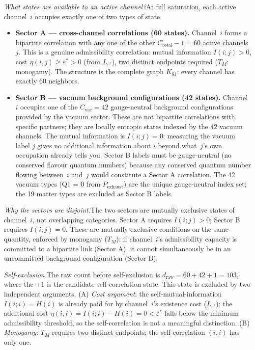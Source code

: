 \documentclass[11pt]{article}
\newenvironment{varlist}{\begin{itemize}[nosep,leftmargin=2em]}{\end{itemize}}
\begin{document}
\textit{What states are available to an active channel?}\quad  At full saturation, each active channel~$i$ occupies exactly one of two types of state.

\begin{varlist}
\item \textbf{Sector A --- cross-channel correlations (60 states).}  Channel~$i$ forms a bipartite correlation with any one of the other $C_{\mathrm{total}} - 1 = 60$ active channels~$j$.  This is a genuine admissibility correlation: mutual information $I(i;j) > 0$, cost $\eta(i,j) \ge \varepsilon^* > 0$ (from $L_{\varepsilon^*}$), two distinct endpoints required ($T_M$: monogamy).  The structure is the complete graph $K_{61}$: every channel has exactly 60 neighbors.
\item \textbf{Sector B --- vacuum background configurations (42 states).}  Channel~$i$ occupies one of the $C_{\mathrm{vac}} = 42$ gauge-neutral background configurations provided by the vacuum sector.  These are not bipartite correlations with specific partners; they are locally entropic states indexed by the 42 vacuum channels.  The mutual information is $I(i;j) = 0$: measuring the vacuum label $j$ gives no additional information about $i$ beyond what~$j$'s own occupation already tells you.  Sector B labels must be gauge-neutral (no conserved flavour quantum numbers) because any conserved quantum number flowing between~$i$ and~$j$ would constitute a Sector A correlation.  The 42 vacuum types (Q1 = 0 from $P_{\mathrm{exhaust}}$) are the unique gauge-neutral index set; the 19 matter types are excluded as Sector B labels.
\end{varlist}

\textit{Why the sectors are disjoint.}\quad The two sectors are mutually exclusive states of channel~$i$, not overlapping categories.  Sector A requires $I(i;j) > 0$; Sector B requires $I(i;j) = 0$.  These are mutually exclusive conditions on the same quantity, enforced by monogamy ($T_M$): if channel~$i$'s admissibility capacity is committed to a bipartite link (Sector A), it cannot simultaneously be in an uncommitted background configuration (Sector B).

\textit{Self-exclusion.}\quad The raw count before self-exclusion is $d_{\mathrm{raw}} = 60 + 42 + 1 = 103$, where the $+1$ is the candidate self-correlation state.  This state is excluded by two independent arguments.  (A) \emph{Cost argument}: the self-mutual-information $I(i;i) = H(i)$ is already paid for by channel~$i$'s existence cost ($L_{\varepsilon^*}$); the additional cost $\eta(i,i) = I(i;i) - H(i) = 0 < \varepsilon^*$ falls below the minimum admissibility threshold, so the self-correlation is not a meaningful distinction.  (B) \emph{Monogamy}: $T_M$ requires two distinct endpoints; the self-correlation $(i,i)$ has only one.
\end{document}

